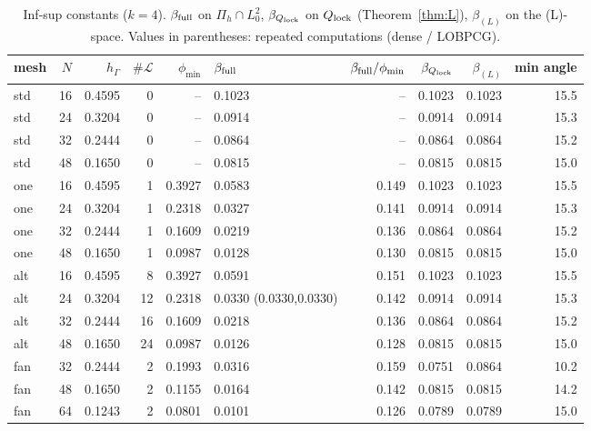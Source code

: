\begin{table}[h]\centering\small
\caption{Inf-sup constants ($k=4$). $\beta_{\rm full}$ on $\Pi_h\cap L^2_0$, $\beta_{Q_{\rm lock}}$ on $Q_{\rm lock}$ (Theorem~\ref{thm:L}), $\beta_{(L)}$ on the (L)-space. Values in parentheses: repeated computations (dense / LOBPCG).}\label{tab:infsup}
\begin{tabular}{lrrrrlrrrr}\toprule
mesh & $N$ & $h_\Gamma$ & $\#\mathcal L$ & $\phi_{\min}$ & $\beta_{\rm full}$ & $\beta_{\rm full}/\phi_{\min}$ & $\beta_{Q_{\rm lock}}$ & $\beta_{(L)}$ & min angle\\\midrule
std & 16 & 0.4595 & 0 & -- & 0.1023 & -- & 0.1023 & 0.1023 & 15.5\\
std & 24 & 0.3204 & 0 & -- & 0.0914 & -- & 0.0914 & 0.0914 & 15.3\\
std & 32 & 0.2444 & 0 & -- & 0.0864 & -- & 0.0864 & 0.0864 & 15.2\\
std & 48 & 0.1650 & 0 & -- & 0.0815 & -- & 0.0815 & 0.0815 & 15.0\\
one & 16 & 0.4595 & 1 & 0.3927 & 0.0583 & 0.149 & 0.1023 & 0.1023 & 15.5\\
one & 24 & 0.3204 & 1 & 0.2318 & 0.0327 & 0.141 & 0.0914 & 0.0914 & 15.3\\
one & 32 & 0.2444 & 1 & 0.1609 & 0.0219 & 0.136 & 0.0864 & 0.0864 & 15.2\\
one & 48 & 0.1650 & 1 & 0.0987 & 0.0128 & 0.130 & 0.0815 & 0.0815 & 15.0\\
alt & 16 & 0.4595 & 8 & 0.3927 & 0.0591 & 0.151 & 0.1023 & 0.1023 & 15.5\\
alt & 24 & 0.3204 & 12 & 0.2318 & 0.0330 (0.0330,0.0330) & 0.142 & 0.0914 & 0.0914 & 15.3\\
alt & 32 & 0.2444 & 16 & 0.1609 & 0.0218 & 0.136 & 0.0864 & 0.0864 & 15.2\\
alt & 48 & 0.1650 & 24 & 0.0987 & 0.0126 & 0.128 & 0.0815 & 0.0815 & 15.0\\
fan & 32 & 0.2444 & 2 & 0.1993 & 0.0316 & 0.159 & 0.0751 & 0.0864 & 10.2\\
fan & 48 & 0.1650 & 2 & 0.1155 & 0.0164 & 0.142 & 0.0815 & 0.0815 & 14.2\\
fan & 64 & 0.1243 & 2 & 0.0801 & 0.0101 & 0.126 & 0.0789 & 0.0789 & 15.0\\
\bottomrule\end{tabular}\end{table}
